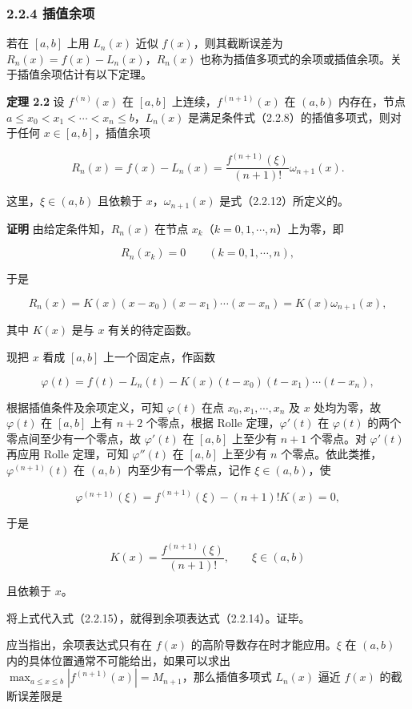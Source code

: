 \subsubsection{2.2.4 插值余项}\label{ch02a-ux63d2ux503cux4f59ux9879}

若在 \([a,b]\) 上用 \(L_n(x)\) 近似 \(f(x)\)，则其截断误差为 \(R_n(x)=f(x)-L_n(x)\)，\(R_n(x)\) 也称为插值多项式的余项或插值余项。关于插值余项估计有以下定理。

\textbf{定理 2.2} 设 \(f^{(n)}(x)\) 在 \([a,b]\) 上连续，\(f^{(n+1)}(x)\) 在 \((a,b)\) 内存在，节点 \(a\le x_0<x_1<\cdots<x_n\le b\)，\(L_n(x)\) 是满足条件式（2.2.8）的插值多项式，则对于任何 \(x\in[a,b]\)，插值余项

\[
R_n(x)=f(x)-L_n(x)=\frac{f^{(n+1)}(\xi)}{(n+1)!}\omega_{n+1}(x).
\tag{2.2.14}
\]

这里，\(\xi\in(a,b)\) 且依赖于 \(x\)，\(\omega_{n+1}(x)\) 是式（2.2.12）所定义的。

\textbf{证明} 由给定条件知，\(R_n(x)\) 在节点 \(x_k\)（\(k=0,1,\cdots,n\)）上为零，即

\[
R_n(x_k)=0\qquad(k=0,1,\cdots,n),
\]

于是

\[
R_n(x)=K(x)(x-x_0)(x-x_1)\cdots(x-x_n)=K(x)\omega_{n+1}(x),
\tag{2.2.15}
\]

其中 \(K(x)\) 是与 \(x\) 有关的待定函数。

现把 \(x\) 看成 \([a,b]\) 上一个固定点，作函数

\[
\varphi(t)=f(t)-L_n(t)-K(x)(t-x_0)(t-x_1)\cdots(t-x_n),
\]

根据插值条件及余项定义，可知 \(\varphi(t)\) 在点 \(x_0,x_1,\cdots,x_n\) 及 \(x\) 处均为零，故 \(\varphi(t)\) 在 \([a,b]\) 上有 \(n+2\) 个零点，根据 Rolle 定理，\(\varphi'(t)\) 在 \(\varphi(t)\) 的两个零点间至少有一个零点，故 \(\varphi'(t)\) 在 \([a,b]\) 上至少有 \(n+1\) 个零点。对 \(\varphi'(t)\) 再应用 Rolle 定理，可知 \(\varphi''(t)\) 在 \([a,b]\) 上至少有 \(n\) 个零点。依此类推，\(\varphi^{(n+1)}(t)\) 在 \((a,b)\) 内至少有一个零点，记作 \(\xi\in(a,b)\)，使

\[
\varphi^{(n+1)}(\xi)=f^{(n+1)}(\xi)-(n+1)!K(x)=0,
\]

于是

\[
K(x)=\frac{f^{(n+1)}(\xi)}{(n+1)!},\qquad \xi\in(a,b)
\]

且依赖于 \(x\)。

将上式代入式（2.2.15），就得到余项表达式（2.2.14）。证毕。

应当指出，余项表达式只有在 \(f(x)\) 的高阶导数存在时才能应用。\(\xi\) 在 \((a,b)\) 内的具体位置通常不可能给出，如果可以求出 \(\max_{a\le x\le b}|f^{(n+1)}(x)|=M_{n+1}\)，那么插值多项式 \(L_n(x)\) 逼近 \(f(x)\) 的截断误差限是

